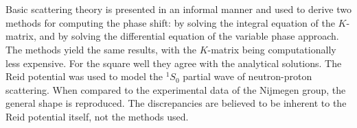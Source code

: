 
\makeatletter
\renewenvironment{abstract}{%
    \if@twocolumn
      \section*{\abstractname}%
    \else %
      \begin{center}%
        {\bfseries \large\abstractname\vspace{\z@}}%
      \end{center}%
      \quotation
    \fi}
    {\if@twocolumn\else\endquotation\fi}
\makeatother

\begin{abstract}

  Basic scattering theory is presented in an informal manner and used to derive
  two methods for computing the phase shift: by solving the integral equation of
  the \(K\)-matrix, and by solving the differential equation of the variable
  phase approach. The methods yield the same results, with the \(K\)-matrix
  being computationally less expensive. For the square well they agree with the
  analytical solutions. The Reid potential was used to model the
  \(^{1}S_{0}\) partial wave of neutron-proton scattering. When
  compared to the experimental data of the Nijmegen group, the general shape is reproduced. The discrepancies are believed to
  be inherent to the Reid potential itself, not the methods used.
\end{abstract}

